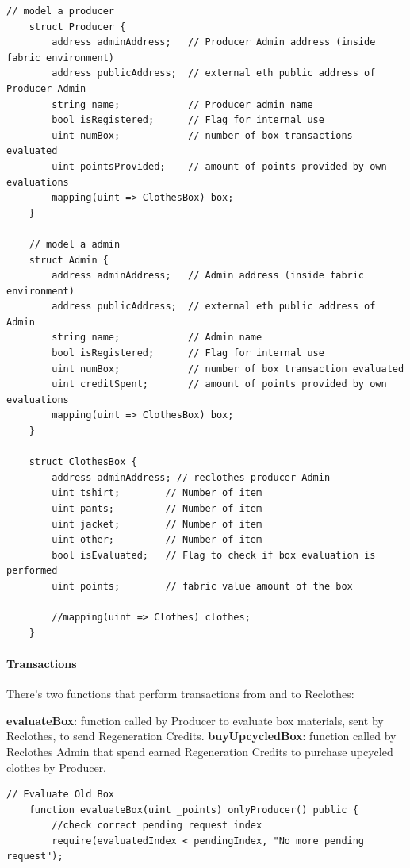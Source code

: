 {\begin{lstlisting}[language=Solidity]
    // model a producer
    struct Producer {
        address adminAddress;   // Producer Admin address (inside fabric environment)
        address publicAddress;  // external eth public address of Producer Admin
        string name;            // Producer admin name
        bool isRegistered;      // Flag for internal use
        uint numBox;            // number of box transactions evaluated
        uint pointsProvided;    // amount of points provided by own evaluations
        mapping(uint => ClothesBox) box;
    }

    // model a admin
    struct Admin {
        address adminAddress;   // Admin address (inside fabric environment)
        address publicAddress;  // external eth public address of Admin
        string name;            // Admin name
        bool isRegistered;      // Flag for internal use
        uint numBox;            // number of box transaction evaluated
        uint creditSpent;       // amount of points provided by own evaluations
        mapping(uint => ClothesBox) box;
    }

    struct ClothesBox {
        address adminAddress; // reclothes-producer Admin
        uint tshirt;        // Number of item
        uint pants;         // Number of item
        uint jacket;        // Number of item
        uint other;         // Number of item
        bool isEvaluated;   // Flag to check if box evaluation is performed
        uint points;        // fabric value amount of the box

        //mapping(uint => Clothes) clothes;
    }
\end{lstlisting}

\paragraph{Transactions}

There's two functions that perform transactions from and to Reclothes:

\begin{outline}[enumerate]
    \1 \textbf{evaluateBox}: function called by Producer to evaluate box materials, sent by Reclothes, 
    to send Regeneration Credits.
    \1 \textbf{buyUpcycledBox}: function called by Reclothes Admin that spend earned Regeneration Credits
    to purchase upcycled clothes by Producer. 
\end{outline}

\begin{lstlisting}[language=Solidity]
    // Evaluate Old Box
    function evaluateBox(uint _points) onlyProducer() public {
        //check correct pending request index
        require(evaluatedIndex < pendingIndex, "No more pending request");


\end{lstlisting}}
